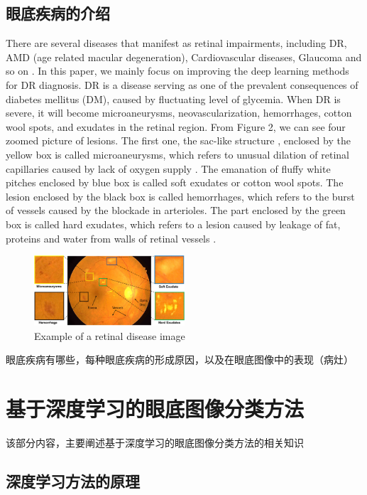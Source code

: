 \documentclass{ijisa}
\begin{document}
\subsection{眼底疾病的介绍}
There are several diseases that manifest as retinal impairments, including DR, AMD (age related macular degeneration), Cardiovascular diseases, Glaucoma and so on \cite{badar2020application}. In this paper, we mainly focus on improving the deep learning methods for DR diagnosis. DR is a disease serving as one of the prevalent consequences of diabetes mellitus (DM), caused by fluctuating level of glycemia. When DR is severe, it will become microaneurysms, neovascularization, hemorrhages, cotton wool spots, and exudates in the retinal region. From Figure 2, we can see four zoomed picture of lesions. The first one, the sac-like structure \cite{badar2020application}, enclosed by the yellow box is called microaneurysms, which refers to unusual dilation of retinal capillaries caused by lack of oxygen supply \cite{badar2020application}. The emanation of fluffy white pitches \cite{badar2020application} enclosed by blue box is called soft exudates or cotton wool spots. The lesion enclosed by the black box is called hemorrhages, which refers to the burst of vessels \cite{badar2020application} caused by the blockade in arterioles. The part enclosed by the green box is called hard exudates, which refers to a lesion caused by leakage of fat, proteins and water from walls of retinal vessels \cite{badar2020application}. 
\begin{figure}[h]
\centering
\includegraphics[width=0.5\textwidth]{figures/retinal_image1.jpeg}
\caption{Example of a retinal disease image}
\end{figure}

眼底疾病有哪些，每种眼底疾病的形成原因，以及在眼底图像中的表现（病灶）

\section{基于深度学习的眼底图像分类方法}

该部分内容，主要阐述基于深度学习的眼底图像分类方法的相关知识

\subsection{深度学习方法的原理}
\end{document}

